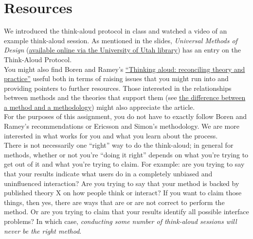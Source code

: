 \documentclass{article}
\begin{document}
\section{Resources}
We introduced the think-aloud protocol in class and watched a video of an example think-aloud session. As mentioned in the slides, \textit{Universal Methods of Design} (\href{https://utah-primoprod.hosted.exlibrisgroup.com/primo-explore/fulldisplay?docid=UUU_ALMA21274580350002001&context=L&vid=UTAH}{available online via the University of Utah library}) has an entry on the Think-Aloud Protocol. \\

You might also find Boren and Ramey's \href{https://ieeexplore.ieee.org/document/867942/}{``Thinking aloud: reconciling theory and practice''} useful both in terms of raising issues that you might run into and providing pointers to further resources. Those interested in the relationships between methods and the theories that support them (see \href{https://uxdesign.cc/method-vs-methodology-whats-the-difference-9cc755c2e69d}{the difference between a method and a methodology}) might also appreciate the article.\\

For the purposes of this assignment, you do not have to exactly follow Boren and Ramey's recommendations or Ericsson and Simon's methodology. We are more interested in what works for you and what you learn about the process.\\

There is not necessarily one ``right'' way to do the think-aloud; in general for methods, whether or not you're ``doing it right'' depends on what you're trying to get out of it and what you're trying to claim. For example: are you trying to say that your results indicate what users do in a completely unbiased and uninfluenced interaction? Are you trying to say that your method is backed by published theory X on how people think or interact? If you want to claim those things, then yes, there are ways that are or are not correct to perform the method. Or are you trying to claim that your results identify all possible interface problems? In which case, \textit{conducting some number of think-aloud sessions will never be the right method}.
\end{document}
